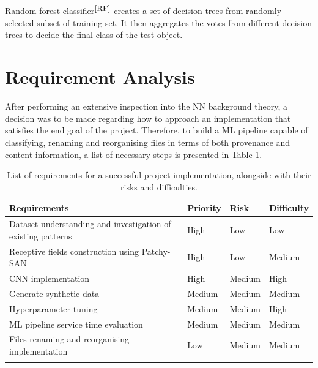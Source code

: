 Random forest classifier$^{\small \cite{RF}}$ creates a set of decision trees from randomly selected subset of training set. It then aggregates the votes from different decision trees to decide the final class of the test object. \\

\section{Requirement Analysis} \label{Requirement Analysis}

After performing an extensive inspection into the NN background theory, a decision was to be made regarding how to approach an implementation that satisfies the end goal of the project. Therefore, to build a ML pipeline capable of classifying, renaming and reorganising files in terms of both provenance and content information, a list of necessary steps is presented in Table \ref{Requirements overview}. \bigskip

\begin{longtable}{|p{}|p{}|p{}|p{}|}
  \hline
  \textbf{Requirements}                                        & \textbf{Priority} & \textbf{Risk} & \textbf{Difficulty} \\
  \hline
  Dataset understanding and investigation of existing patterns & High              & Low           & Low                 \\

  Receptive fields construction using Patchy-SAN               & High              & Low           & Medium              \\

  CNN implementation                                           & High              & Medium        & High                \\

  Generate synthetic data                                      & Medium            & Medium        & Medium              \\

  Hyperparameter tuning                                        & Medium            & Medium        & High                \\

  ML pipeline service time evaluation                          & Medium            & Medium        & Medium              \\

  Files renaming and reorganising implementation               & Low               & Medium        & Medium              \\

  \hline
  \caption[Requirements overview]{List of requirements for a successful project implementation, alongside with their risks and difficulties.}
  \label{Requirements overview}
\end{longtable} \bigskip


